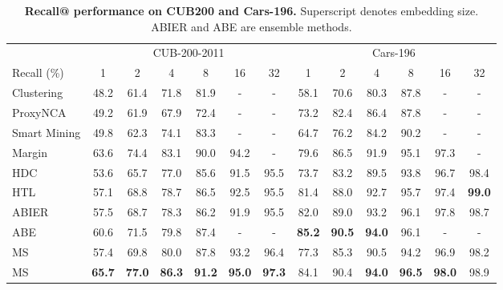 \documentclass[10pt,twocolumn,letterpaper]{article}
\newcommand{\tablestyle}[2]{\setlength{\tabcolsep}{#1}\renewcommand{\arraystretch}{#2}\centering\footnotesize}
\begin{document}
\begin{table*}[t]
    \tablestyle{10pt}{1.1}
	\begin{center}
		\begin{tabular}{l|cccccc|cccccc}
			& \multicolumn{6}{c}{CUB-200-2011}  &\multicolumn{6}{c}{Cars-196}\\
			Recall  (\%) & 1 & 2 & 4 & 8 & 16 & 32 & 1 & 2 & 4 & 8 & 16 & 32\\ \shline
			{Clustering \cite{struct-clustering}}  &48.2 & 61.4 & 71.8 & 81.9 & - & - & 58.1 & 70.6 & 80.3 & 87.8 & - & -\\ 
			{ProxyNCA \cite{proxyloss}} &49.2 & 61.9 & 67.9 & 72.4 & - & - & 73.2 & 82.4 & 86.4 & 87.8 & - & -\\
			{Smart Mining \cite{smart-mining}} &49.8 & 62.3 & 74.1 & 83.3 & - & - & 64.7 & 76.2 & 84.2 & 90.2 & - & -\\ 
			{Margin \cite{sampling}}& 63.6& 74.4& 83.1& 90.0& 94.2 & - & 79.6& 86.5& 91.9& 95.1& 97.3 & - \\
			HDC \cite{struct-clustering}& 53.6 & 65.7 & 77.0 & 85.6 & 91.5 & 95.5 & 73.7 & 83.2 & 89.5 & 93.8 & 96.7 & 98.4\\ 
			HTL \cite{HTL} & 57.1& 68.8& 78.7& 86.5& 92.5& 95.5 & 81.4& 88.0& 92.7& 95.7& 97.4& \bf{99.0} \\\hline
			ABIER \cite{bier}&57.5 &68.7 &78.3 &86.2 &91.9 &95.5 &82.0 &89.0 &93.2 &96.1 &97.8 &98.7\\
			ABE \cite{Kim_2018_ECCV}  & 60.6 & 71.5 & 79.8 & 87.4 & - & - & \bf 85.2 & \textbf{90.5} & \textbf{94.0} & 96.1 & - & -\\
\hline 
			MS& 57.4& 69.8&  80.0&  87.8& 93.2& 96.4 & 77.3& 85.3& 90.5& 94.2& 96.9& 98.2\\ 
			MS& \bf65.7& \bf77.0& \bf86.3& \bf91.2& \bf95.0& \bf97.3& 84.1& 90.4 & \bf94.0& \bf96.5& \bf98.0& 98.9\\
\end{tabular}
		\vspace{3pt}
		\caption{\textbf{Recall@ performance on CUB200 and Cars-196.} Superscript denotes embedding size. ABIER \cite{bier} and ABE \cite{Kim_2018_ECCV} are ensemble methods.}
		\label{cub-car-table}
		\vspace{-15pt}
	\end{center}
\end{table*}
\end{document}
